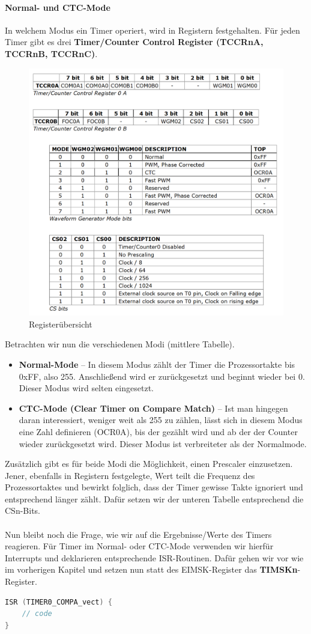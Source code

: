\documentclass[11pt,a4paper]{scrartcl}
\begin{document}
\paragraph{Normal- und CTC-Mode}
In welchem Modus ein Timer operiert, wird in Registern festgehalten. Für jeden Timer gibt es drei \textbf{Timer/Counter Control Register (TCCRnA, TCCRnB, TCCRnC)}.
\begin{figure}[h!]
\centering
\includegraphics[scale=0.6]{timer_counter.png}
\caption{Registerübersicht}
\end{figure}
Betrachten wir nun die verschiedenen Modi (mittlere Tabelle).
\begin{itemize}
\item \textbf{Normal-Mode} -- In diesem Modus zählt der Timer die Prozessortakte bis 0xFF, also 255. Anschließend wird er zurückgesetzt und beginnt wieder bei 0. Dieser Modus wird selten eingesetzt.
\item \textbf{CTC-Mode (Clear Timer on Compare Match)} -- Ist man hingegen daran interessiert, weniger weit als 255 zu zählen, lässt sich in diesem Modus eine Zahl definieren (OCR0A), bis der gezählt wird und ab der der Counter wieder zurückgesetzt wird. Dieser Modus ist verbreiteter als der Normalmode.
\end{itemize}
Zusätzlich gibt es für beide Modi die Möglichkeit, einen Prescaler einzusetzen. Jener, ebenfalls in Registern festgelegte, Wert teilt die Frequenz des Prozessortaktes und bewirkt folglich, dass der Timer gewisse Takte ignoriert und entsprechend länger zählt. Dafür setzen wir der unteren Tabelle entsprechend die CSn-Bits. \\\\
Nun bleibt noch die Frage, wie wir auf die Ergebnisse/Werte des Timers reagieren. Für Timer im Normal- oder CTC-Mode verwenden wir hierfür Interrupts und deklarieren entsprechende ISR-Routinen. Dafür gehen wir vor wie im vorherigen Kapitel und setzen nun statt des EIMSK-Register das \textbf{TIMSKn}-Register. 
\begin{lstlisting}[language=C]
ISR (TIMER0_COMPA_vect) {
	// code
}
\end{lstlisting}
\end{document}
